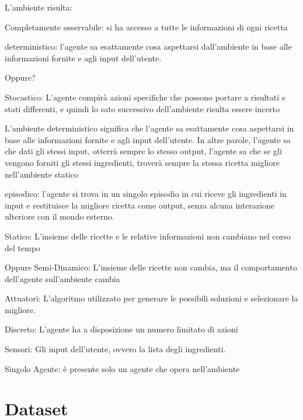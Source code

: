 \documentclass[12pt]{report}
\begin{document}
L’ambiente risulta: 

Completamente osservabile: si ha accesso a tutte le informazioni di ogni ricetta 

deterministico: l'agente sa esattamente cosa aspettarsi dall'ambiente in base alle informazioni fornite e agli input dell'utente. 

Oppure? 

Stocastico: L’agente compirà azioni specifiche che possono portare a risultati e stati differenti, e quindi lo sato successivo dell’ambiente risulta essere incerto 

L'ambiente deterministico significa che l'agente sa esattamente cosa aspettarsi in base alle informazioni fornite e agli input dell'utente. In altre parole, l'agente sa che dati gli stessi input, otterrà sempre lo stesso output, l'agente sa che se gli vengono forniti gli stessi ingredienti, troverà sempre la stessa ricetta migliore nell'ambiente statico 

episodico: l'agente si trova in un singolo episodio in cui riceve gli ingredienti in input e restituisce la migliore ricetta come output, senza alcuna interazione ulteriore con il mondo esterno. 

Statico: L’insieme delle ricette e le relative informazioni non cambiano nel corso del tempo 

Oppure Semi-Dinamico: L’insieme delle ricette non cambia, ma il comportamento dell’agente sull’ambiente cambia 

Attuatori: L'algoritmo utilizzato per generare le possibili soluzioni e selezionare la migliore. 

Discreto: L’agente ha a disposizione un numero limitato di azioni 

Sensori: Gli input dell'utente, ovvero la lista degli ingredienti. 

Singolo Agente: è presente solo un agente che opera nell’ambiente 

\chapter{Dataset}
\end{document}

